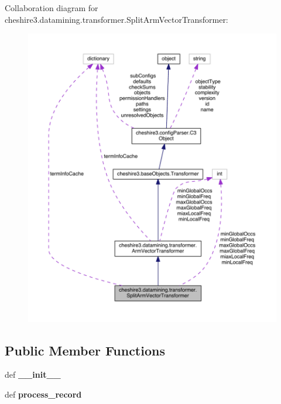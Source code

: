 Collaboration diagram for cheshire3.\-datamining.\-transformer.\-Split\-Arm\-Vector\-Transformer\-:
\nopagebreak
\begin{figure}[H]
\begin{center}
\leavevmode
\includegraphics[width=350pt]{classcheshire3_1_1datamining_1_1transformer_1_1_split_arm_vector_transformer__coll__graph}
\end{center}
\end{figure}
\subsection*{Public Member Functions}
\begin{DoxyCompactItemize}
\item 
\hypertarget{classcheshire3_1_1datamining_1_1transformer_1_1_split_arm_vector_transformer_ad1406a7eeeba59d0da43e2ba4abec365}{def {\bfseries \-\_\-\-\_\-init\-\_\-\-\_\-}}\label{classcheshire3_1_1datamining_1_1transformer_1_1_split_arm_vector_transformer_ad1406a7eeeba59d0da43e2ba4abec365}

\item 
\hypertarget{classcheshire3_1_1datamining_1_1transformer_1_1_split_arm_vector_transformer_a68fc7c88ff17373595a03f247ece02f3}{def {\bfseries process\-\_\-record}}\label{classcheshire3_1_1datamining_1_1transformer_1_1_split_arm_vector_transformer_a68fc7c88ff17373595a03f247ece02f3}

\end{DoxyCompactItemize}
